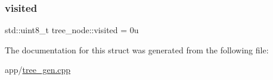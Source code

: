 \mbox{\label{structtree__node_a2cd221687b1d31a8d5e78a754b1cb53c}} 
\subsubsection{\texorpdfstring{visited}{visited}}
{\footnotesize\ttfamily std\+::uint8\+\_\+t tree\+\_\+node\+::visited = 0u}



The documentation for this struct was generated from the following file\+:\begin{DoxyCompactItemize}
\item 
app/\hyperlink{tree__gen_8cpp}{tree\+\_\+gen.\+cpp}\end{DoxyCompactItemize}
